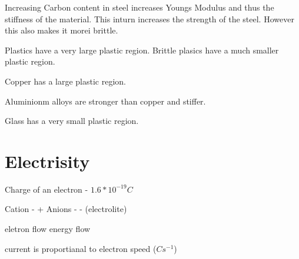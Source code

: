 \documentclass{article}
\begin{document}
Increasing Carbon content  in steel increases Youngs Modulus and thus the stiffness of the material. This inturn increases
the strength of the steel. However this also makes it morei brittle.

Plastics have a very large plastic region. Brittle plasics have a much smaller plastic region.

Copper has a large plastic region. 

Aluminionm alloys are stronger than copper and stiffer.

Glass has a very small plastic region.

\section{Electrisity}

Charge of an electron - $1.6 * 10 ^ {-19}C$

Cation - +
Anions - -
(electrolite)

eletron flow \ne energy flow

current is proportianal to electron speed ($\si{Cs^{-1}}$)
\end{document}
